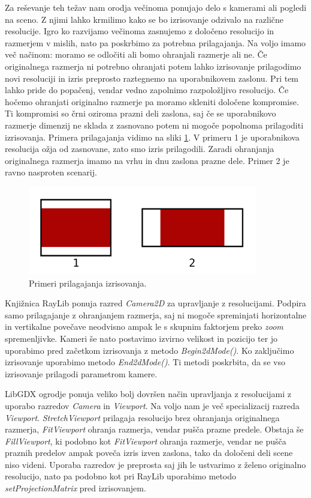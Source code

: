 \documentclass[12pt,a4paper,twoside]{book}
\begin{document}
Za reševanje teh težav nam orodja večinoma ponujajo delo s kamerami ali pogledi na sceno. Z njimi lahko krmilimo kako se bo izrisovanje odzivalo na različne resolucije. Igro ko razvijamo večinoma zasnujemo z določeno resolucijo in razmerjem v mislih, nato pa poskrbimo za potrebna prilagajanja. Na voljo imamo več načinom: moramo se odločiti ali bomo ohranjali razmerje ali ne. Če originalnega razmerja ni potrebno ohranjati potem lahko izrisovanje prilagodimo novi resoluciji in izris preprosto raztegnemo na uporabnikovem zaslonu. Pri tem lahko pride do popačenj, vendar vedno zapolnimo razpoložljivo resolucijo. Če hočemo ohranjati originalno razmerje pa moramo skleniti določene kompromise. Ti kompromisi so črni oziroma prazni deli zaslona, saj če se uporabnikovo razmerje dimenzij ne sklada z zasnovano potem ni mogoče popolnoma prilagoditi izrisovanja. Primera prilagajanja vidimo na sliki \ref{slika:prilagajanje}. V primeru 1 je uporabnikova resolucija ožja od zasnovane, zato smo izris prilagodili. Zaradi ohranjanja originalnega razmerja imamo na vrhu in dnu zaslona prazne dele. Primer 2 je ravno nasproten scenarij.

\begin{figure}[h]
	\centering
	\includegraphics[width=10cm]{prilagajanje}
	\caption{Primeri prilagajanja izrisovanja.}
	\label{slika:prilagajanje}
\end{figure}

Knjižnica RayLib ponuja razred \textit{Camera2D} za upravljanje z resolucijami. Podpira samo prilagajanje z ohranjanjem razmerja, saj ni mogoče spreminjati horizontalne in vertikalne povečave neodvisno ampak le s skupnim faktorjem preko \textit{zoom} spremenljivke. Kameri še nato postavimo izvirno velikost in pozicijo ter jo uporabimo pred začetkom izrisovanja z metodo \textit{Begin2dMode()}. Ko zaključimo izrisovanje uporabimo metodo \textit{End2dMode()}. Ti metodi poskrbita, da se vso izrisovanje prilagodi parametrom kamere.

LibGDX ogrodje ponuja veliko bolj dovršen način upravljanja z resolucijami z uporabo razredov \textit{Camera} in \textit{Viewport}. Na voljo nam je več specializacij razreda \textit{Viewport}. \textit{StretchViewport} prilagaja resolucijo brez ohranjanja originalnega razmerja, \textit{FitViewport} ohranja razmerja, vendar pušča prazne predele. Obstaja še \textit{FillViewport}, ki podobno kot \textit{FitViewport} ohranja razmerje, vendar ne pušča praznih predelov ampak poveča izris izven zaslona, tako da določeni deli scene niso videni. Uporaba razredov je preprosta saj jih le ustvarimo z želeno originalno resolucijo, nato pa podobno kot pri RayLib uporabimo metodo \textit{setProjectionMatrix} pred izrisovanjem.
\end{document}
